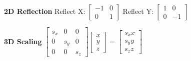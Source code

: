 \documentclass[letterpaper, 8pt]{extarticle}
\begin{document}
\begin{multicols*}{4}
\textbf{2D Reflection}
Reflect X:\@
\(
\begin{bmatrix} -1 & 0 \\ 0 & 1 \end{bmatrix}
\)
Reflect Y:\@
\(
\begin{bmatrix} 1 & 0 \\ 0 & -1 \end{bmatrix}
\)

\textbf{3D Scaling}
\(
\begin{bmatrix}
    s_x & 0   & 0   \\
    0   & s_y & 0   \\
    0   & 0   & s_z
\end{bmatrix}
\begin{bmatrix}
    x \\ y \\ z
\end{bmatrix}
=
\begin{bmatrix}
    s_x x \\ s_y y \\ s_z z
\end{bmatrix}
\)






\end{multicols*}
\end{document}
